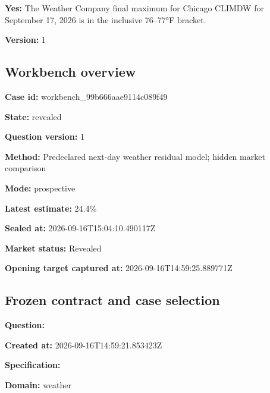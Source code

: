 \documentclass[11pt]{article}
\begin{document}
\par\noindent\textbf{Yes:} The Weather Company final maximum for Chicago CLIMDW for September 17, 2026 is in the inclusive 76–77°F bracket.

\par\noindent\textbf{Version:} 1

\subsection*{\textcolor{epdarkgreen}{Workbench overview}}
\par\noindent\textbf{Case id:} workbench\_99\hspace{0pt}b666aae9114c\hspace{0pt}089f49

\par\noindent\textbf{State:} revealed

\par\noindent\textbf{Question version:} 1

\par\noindent\textbf{Method:} Predeclared next-day weather residual model; hidden market comparison

\par\noindent\textbf{Mode:} prospective

\par\noindent\textbf{Latest estimate:} 24.4\%

\par\noindent\textbf{Sealed at:} 2026-09-16T15:04:10.490117Z

\par\noindent\textbf{Market status:} Revealed

\par\noindent\textbf{Opening target captured at:} 2026-09-16T14:59:25.889771Z

\subsection*{\textcolor{epdarkgreen}{Frozen contract and case selection}}
\par\noindent\textbf{Question:} \par \par\noindent\textbf{Created at:} 2026-09-16T14:59:21.853423Z

\par\noindent\textbf{Specification:} \par \par\noindent\textbf{Domain:} weather
\end{document}
